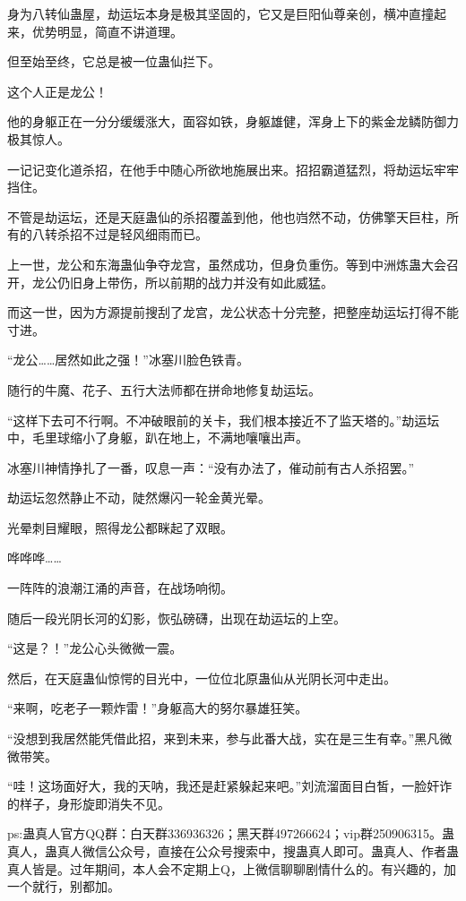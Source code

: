 \begin{this_body}
身为八转仙蛊屋，劫运坛本身是极其坚固的，它又是巨阳仙尊亲创，横冲直撞起来，优势明显，简直不讲道理。

但至始至终，它总是被一位蛊仙拦下。

这个人正是龙公！

他的身躯正在一分分缓缓涨大，面容如铁，身躯雄健，浑身上下的紫金龙鳞防御力极其惊人。

一记记变化道杀招，在他手中随心所欲地施展出来。招招霸道猛烈，将劫运坛牢牢挡住。

不管是劫运坛，还是天庭蛊仙的杀招覆盖到他，他也岿然不动，仿佛擎天巨柱，所有的八转杀招不过是轻风细雨而已。

上一世，龙公和东海蛊仙争夺龙宫，虽然成功，但身负重伤。等到中洲炼蛊大会召开，龙公仍旧身上带伤，所以前期的战力并没有如此威猛。

而这一世，因为方源提前搜刮了龙宫，龙公状态十分完整，把整座劫运坛打得不能寸进。

“龙公……居然如此之强！”冰塞川脸色铁青。

随行的牛魔、花子、五行大法师都在拼命地修复劫运坛。

“这样下去可不行啊。不冲破眼前的关卡，我们根本接近不了监天塔的。”劫运坛中，毛里球缩小了身躯，趴在地上，不满地嚷嚷出声。

冰塞川神情挣扎了一番，叹息一声：“没有办法了，催动前有古人杀招罢。”

劫运坛忽然静止不动，陡然爆闪一轮金黄光晕。

光晕刺目耀眼，照得龙公都眯起了双眼。

哗哗哗……

一阵阵的浪潮江涌的声音，在战场响彻。

随后一段光阴长河的幻影，恢弘磅礴，出现在劫运坛的上空。

“这是？！”龙公心头微微一震。

然后，在天庭蛊仙惊愕的目光中，一位位北原蛊仙从光阴长河中走出。

“来啊，吃老子一颗炸雷！”身躯高大的努尔暴雄狂笑。

“没想到我居然能凭借此招，来到未来，参与此番大战，实在是三生有幸。”黑凡微微带笑。

“哇！这场面好大，我的天呐，我还是赶紧躲起来吧。”刘流溜面目白皙，一脸奸诈的样子，身形旋即消失不见。

ps:蛊真人官方QQ群：白天群336936326；黑天群497266624；vip群250906315。蛊真人，蛊真人微信公众号，直接在公众号搜索中，搜蛊真人即可。蛊真人、作者蛊真人皆是。过年期间，本人会不定期上Q，上微信聊聊剧情什么的。有兴趣的，加一个就行，别都加。

\end{this_body}

